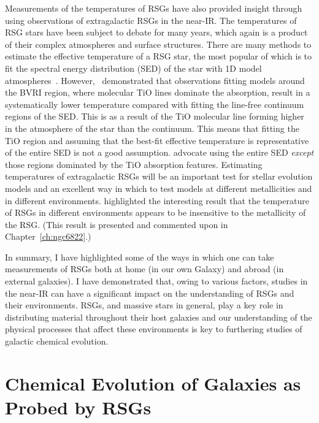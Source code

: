 Measurements of the temperatures of RSGs have also provided insight through using observations of extragalactic RSGs in the near-IR.
The temperatures of RSG stars have been subject to debate for many years, which again is a product of their complex atmospheres and surface structures.
There are many methods to estimate the effective temperature of a RSG star, the most popular of which is to fit the spectral energy distribution (SED) of the star with 1D model atmospheres~\citep{Levesque05,Levesque06}.
However,~\cite{2013ApJ...767....3D} demonstrated that observations fitting models around the BVRI region, where molecular TiO lines dominate the absorption, result in a systematically lower temperature compared with fitting the line-free continuum regions of the SED.
This is as a result of the TiO molecular line forming higher in the atmosphere of the star than the continuum.
This means that fitting the TiO region and assuming that the best-fit effective temperature is representative of the entire SED is not a good assumption.
\cite{2013ApJ...767....3D} advocate using the entire SED \textit{except} those regions dominated by the TiO absorption features.
Estimating temperatures of extragalactic RSGs will be an important test for stellar evolution models and an excellent way in which to test models at different metallicities and in different environments.
\cite{2015ApJ...803...14P} highlighted the interesting result that the temperature of RSGs in different environments appears to be insensitive to the metallicity of the RSG. (This result is presented and commented upon in Chapter~\ref{ch:ngc6822}.)

In summary, I have highlighted some of the ways in which one can take measurements of RSGs both at home (in our own Galaxy) and abroad (in external galaxies).
I have demonstrated that, owing to various factors, studies in the near-IR can have a significant impact on the understanding of RSGs and their environments.
RSGs, and massive stars in general, play a key role in distributing material throughout their host galaxies and our understanding of the physical processes that affect these environments is key to furthering studies of galactic chemical evolution.


\section{Chemical Evolution of Galaxies as Probed by RSGs} %
\label{sec:chemical evolution}

